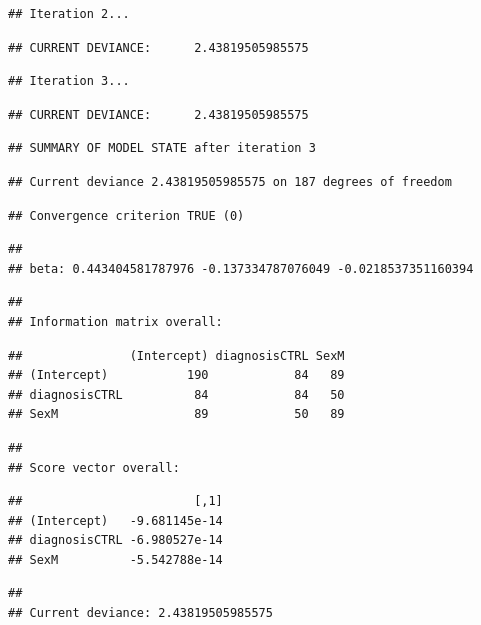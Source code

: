 \documentclass[
]{book}
\begin{document}
\begin{verbatim}
## Iteration 2...
\end{verbatim}

\begin{verbatim}
## CURRENT DEVIANCE:      2.43819505985575
\end{verbatim}

\begin{verbatim}
## Iteration 3...
\end{verbatim}

\begin{verbatim}
## CURRENT DEVIANCE:      2.43819505985575
\end{verbatim}

\begin{verbatim}
## SUMMARY OF MODEL STATE after iteration 3
\end{verbatim}

\begin{verbatim}
## Current deviance 2.43819505985575 on 187 degrees of freedom
\end{verbatim}

\begin{verbatim}
## Convergence criterion TRUE (0)
\end{verbatim}

\begin{verbatim}
## 
## beta: 0.443404581787976 -0.137334787076049 -0.0218537351160394
\end{verbatim}

\begin{verbatim}
## 
## Information matrix overall:
\end{verbatim}

\begin{verbatim}
##               (Intercept) diagnosisCTRL SexM
## (Intercept)           190            84   89
## diagnosisCTRL          84            84   50
## SexM                   89            50   89
\end{verbatim}

\begin{verbatim}
## 
## Score vector overall:
\end{verbatim}

\begin{verbatim}
##                        [,1]
## (Intercept)   -9.681145e-14
## diagnosisCTRL -6.980527e-14
## SexM          -5.542788e-14
\end{verbatim}

\begin{verbatim}
## 
## Current deviance: 2.43819505985575
\end{verbatim}
\end{document}
